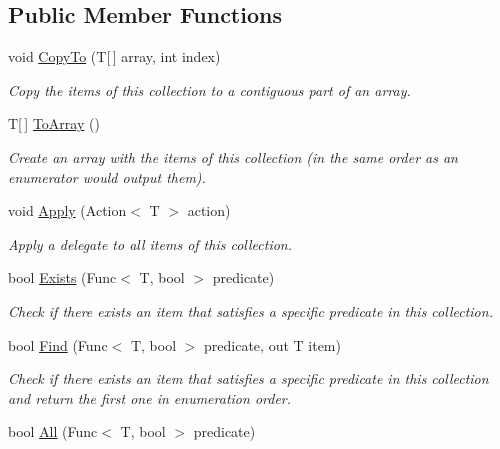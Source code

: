 \subsection*{Public Member Functions}
\begin{DoxyCompactItemize}
\item 
void \hyperlink{interface_c5_1_1_i_collection_value_aced299d8dce69c33ff75b598e39581d1}{Copy\+To} (T\mbox{[}$\,$\mbox{]} array, int index)
\begin{DoxyCompactList}\small\item\em Copy the items of this collection to a contiguous part of an array. \end{DoxyCompactList}\item 
T\mbox{[}$\,$\mbox{]} \hyperlink{interface_c5_1_1_i_collection_value_ad76547324e71a04e92076b2e55239bbb}{To\+Array} ()
\begin{DoxyCompactList}\small\item\em Create an array with the items of this collection (in the same order as an enumerator would output them). \end{DoxyCompactList}\item 
void \hyperlink{interface_c5_1_1_i_collection_value_aadcb9ce9d9362c0ade0c7d620e3cc182}{Apply} (Action$<$ T $>$ action)
\begin{DoxyCompactList}\small\item\em Apply a delegate to all items of this collection. \end{DoxyCompactList}\item 
bool \hyperlink{interface_c5_1_1_i_collection_value_a3c20f35782dbd046f9aba5ec13dad789}{Exists} (Func$<$ T, bool $>$ predicate)
\begin{DoxyCompactList}\small\item\em Check if there exists an item that satisfies a specific predicate in this collection. \end{DoxyCompactList}\item 
bool \hyperlink{interface_c5_1_1_i_collection_value_a3e175f833398fa6a6cde45e4948bc152}{Find} (Func$<$ T, bool $>$ predicate, out T item)
\begin{DoxyCompactList}\small\item\em Check if there exists an item that satisfies a specific predicate in this collection and return the first one in enumeration order. \end{DoxyCompactList}\item 
bool \hyperlink{interface_c5_1_1_i_collection_value_a099c3a257e5c0b7212e34e52a4a4bda2}{All} (Func$<$ T, bool $>$ predicate)

\end{DoxyCompactItemize}
